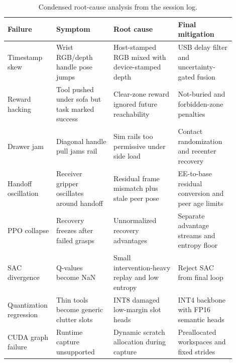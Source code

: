 \documentclass[10pt,twocolumn]{article}
\begin{document}
\begin{table}[h]
\centering
\caption{Condensed root-cause analysis from the session log.}
\begin{tabular}{p{0.15\linewidth}p{0.24\linewidth}p{0.27\linewidth}p{0.24\linewidth}}
\toprule
Failure & Symptom & Root cause & Final mitigation \\
\midrule
Timestamp skew & Wrist RGB/depth handle pose jumps & Host-stamped RGB mixed with device-stamped depth & USB delay filter and uncertainty-gated fusion \\
Reward hacking & Tool pushed under sofa but task marked success & Clear-zone reward ignored future reachability & Not-buried and forbidden-zone penalties \\
Drawer jam & Diagonal handle pull jams rail & Sim rails too permissive under side load & Contact randomization and recenter recovery \\
Handoff oscillation & Receiver gripper oscillates around handoff & Residual frame mismatch plus stale peer pose & EE-to-base residual conversion and peer age limits \\
PPO collapse & Recovery freezes after failed grasps & Unnormalized recovery advantages & Separate advantage streams and entropy floor \\
SAC divergence & Q-values become NaN & Small intervention-heavy replay and low entropy & Reject SAC from final loop \\
Quantization regression & Thin tools become generic clutter slots & INT8 damaged low-margin slot heads & INT4 backbone with FP16 semantic heads \\
CUDA graph failure & Runtime capture unsupported & Dynamic scratch allocation during capture & Preallocated workspaces and fixed strides \\
\bottomrule
\end{tabular}
\end{table}
\end{document}
